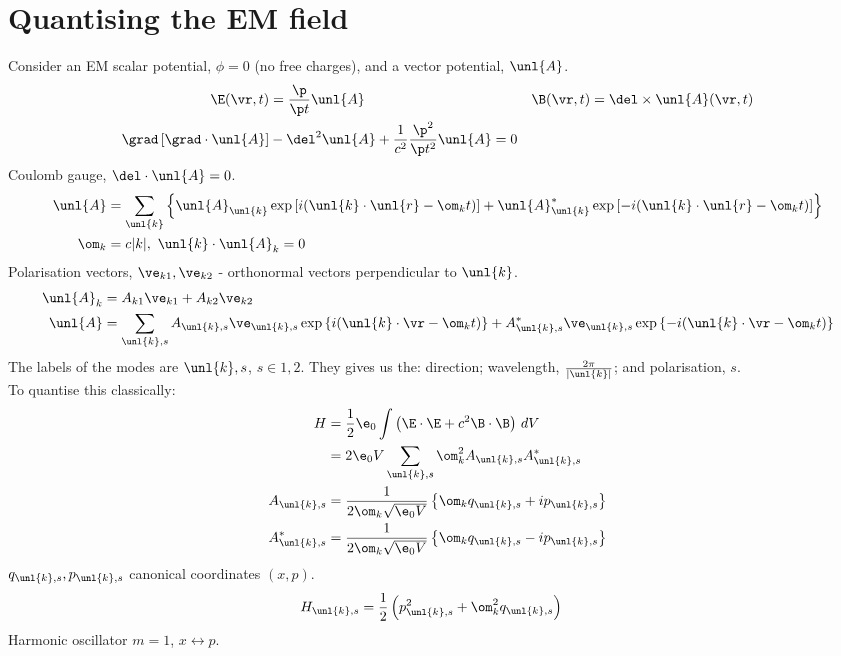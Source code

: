 \documentclass[a4paper, 11pt, normalem]{report}
\begin{document}
\section{Quantising the EM field}
Consider an EM scalar potential, $\phi=0$ (no free charges), and a vector potential, $\unl{A}$.
\begin{align}
    \E(\vr,t) &= \frac{\p}{\p t}\unl{A} & \B(\vr,t) &= \del\times\unl{A}(\vr,t) \\
    \grad\left[\grad\cdot\unl{A}\right] &- \del^2\unl{A} + \frac{1}{c^2}\frac{\p^2}{\p t^2}\unl{A} = 0
\end{align}
Coulomb gauge, $\del\cdot\unl{A} = 0$.
\begin{align}
    \unl{A} &= \sum_{\unl{k}} \left\{ \unl{A}_{\unl{k}}\exp\left[i(\unl{k}\cdot\unl{r}-\om_kt)\right] + \unl{A}^*_{\unl{k}}\exp\left[-i(\unl{k}\cdot\unl{r} - \om_kt)\right]\right\} \\
    \om_k &= c|k|,~ \unl{k}\cdot\unl{A}_{k} = 0
\end{align}
Polarisation vectors, $\ve_{k1},\ve_{k2}$ - orthonormal vectors perpendicular to $\unl{k}$.
\begin{align}
    \unl{A}_k &= A_{k1}\ve_{k1} + A_{k2}\ve_{k2} \\
    \unl{A} &= \sum_{\unl{k},s} A_{\unl{k},s}\ve_{\unl{k},s}\exp\left\{i(\unl{k}\cdot\vr-\om_kt)\right\} + A_{\unl{k},s}^*\ve_{\unl{k},s}\exp\left\{-i(\unl{k}\cdot\vr-\om_kt)\right\}
\end{align}
The labels of the modes are $\unl{k},s$, $s\in1,2$. 
They gives us the: direction; wavelength, $\frac{2\pi}{|\unl{k}|}$; and polarisation, $s$.\\
To quantise this classically:
\begin{align}
    H &= \frac12\e_0 \int \left(\E\cdot\E + c^2\B\cdot\B\right)\,dV \\
      &= 2\e_0 V \sum_{\unl{k},s} \om_k^2 A_{\unl{k},s}A_{\unl{k},s}^* \\
    A_{\unl{k},s} &= \frac{1}{2\om_k\sqrt{\e_0V}} \left\{\om_kq_{\unl{k},s} + ip_{\unl{k},s}\right\} \\
    A_{\unl{k},s}^* &= \frac{1}{2\om_k\sqrt{\e_0V}} \left\{\om_kq_{\unl{k},s} - ip_{\unl{k},s}\right\}
\end{align}
$q_{\unl{k},s},p_{\unl{k},s}$ canonical coordinates $(x,p)$.
\begin{align}
    H_{\unl{k},s} &= \frac12\left(p^2_{\unl{k},s} + \om_k^2q_{\unl{k},s}\right)
\end{align}
Harmonic oscillator $m=1$, $x\leftrightarrow p$.
\end{document}
